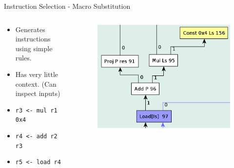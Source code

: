 \documentclass[en,16:9]{sdqbeamer}
\begin{document}
\begin{frame}{Instruction Selection - Macro Substitution}
	\begin{columns}
		\begin{column}{0.5\textwidth}
			\begin{itemize}
				\item Generates instructions using simple rules.
				\item Has very little context. (Can inspect inputs)
				\vspace{3em}
				\item \texttt{r3 <- mul r1 0x4}
				\item \texttt{r4 <- add r2 r3}
				\item \texttt{r5 <- load r4}
			\end{itemize}
		\end{column}

		\begin{column}{0.5\textwidth}
			\begin{figure}
				\centering
				\includegraphics[scale=0.3]{images/instruction-selection.png}
			\end{figure}
		\end{column}
	\end{columns}
\end{frame}
\end{document}
